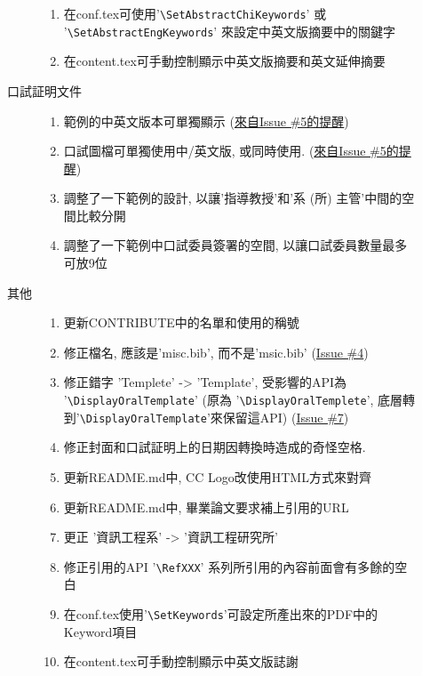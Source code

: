 \begin{description}
\begin{description}
\begin{enumerate}
          \item 在conf.tex可使用'\verb|\SetAbstractChiKeywords|' 或 '\verb|\SetAbstractEngKeywords|' 來設定中英文版摘要中的關鍵字
          \item 在content.tex可手動控制顯示中英文版摘要和英文延伸摘要
        \end{enumerate}
      \item[口試証明文件] \hfill
        \begin{enumerate}
          \item 範例的中英文版本可單獨顯示 (\href{https://github.com/wengan-li/ncku-thesis-template-latex/issues/5}{來自Issue \#5的提醒})
          \item 口試圖檔可單獨使用中/英文版, 或同時使用. (\href{https://github.com/wengan-li/ncku-thesis-template-latex/issues/5}{來自Issue \#5的提醒})
          \item 調整了一下範例的設計, 以讓'指導教授'和'系 (所) 主管'中間的空間比較分開
          \item 調整了一下範例中口試委員簽署的空間, 以讓口試委員數量最多可放9位
        \end{enumerate}
      \item[其他] \hfill
        \begin{enumerate}
          \item 更新CONTRIBUTE中的名單和使用的稱號
          \item 修正檔名, 應該是'misc.bib', 而不是'msic.bib' (\href{https://github.com/wengan-li/ncku-thesis-template-latex/issues/4}{Issue \#4})
          \item 修正錯字 'Templete' -> 'Template', 受影響的API為 '\verb|\DisplayOralTemplate|' (原為 '\verb|\DisplayOralTemplete|', 底層轉到'\verb|\DisplayOralTemplate|'來保留這API) (\href{https://github.com/wengan-li/ncku-thesis-template-latex/issues/7}{Issue \#7})
          \item 修正封面和口試証明上的日期因轉換時造成的奇怪空格.
          \item 更新README.md中, CC Logo改使用HTML方式來對齊
          \item 更新README.md中, 畢業論文要求補上引用的URL
          \item 更正 '資訊工程系' -> '資訊工程研究所'
          \item 修正引用的API '\verb|\RefXXX|' 系列所引用的內容前面會有多餘的空白
          \item 在conf.tex使用'\verb|\SetKeywords|'可設定所產出來的PDF中的Keyword項目
          \item 在content.tex可手動控制顯示中英文版誌謝
        \end{enumerate}
    \end{description}


\end{description}
